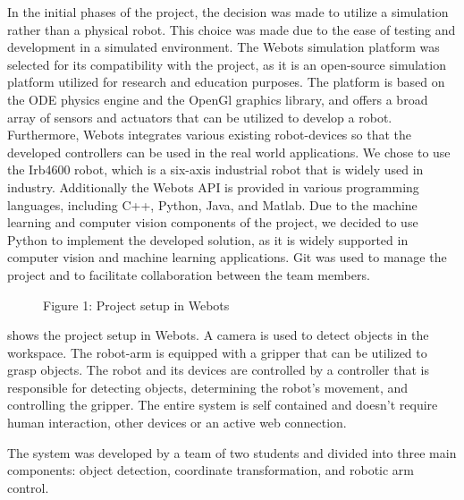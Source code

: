 In the initial phases of the project, the decision was made to utilize a simulation rather than a physical robot. This choice was made due to the ease of testing and development in a simulated environment. The Webots simulation platform was selected for its compatibility with the project, as it is an open-source simulation platform utilized for research and education purposes. The platform is based on the ODE physics engine and the OpenGl graphics library, and offers a broad array of sensors and actuators that can be utilized to develop a robot. Furthermore, Webots integrates various existing robot-devices so that the developed controllers can be used in the real world applications. We chose to use the Irb4600 robot, which is a six-axis industrial robot that is widely used in industry. Additionally the Webots API is provided in various programming languages, including C++, Python, Java, and Matlab. Due to the machine learning and computer vision components of the project, we decided to use Python to implement the developed solution, as it is widely supported in computer vision and machine learning applications. Git was used to manage the project and to facilitate collaboration between the team members.


\begin{figure}[!h]
    \centering
    \caption{Figure 1: Project setup in Webots }
    \label{fig:project_setup}
\end{figure}

 shows the project setup in Webots. A camera is used to detect objects in the workspace. The robot-arm is equipped with a gripper that can be utilized to grasp objects. The robot and its devices are controlled by a controller that is responsible for detecting objects, determining the robot's movement, and controlling the gripper. The entire system is self contained and doesn't require human interaction, other devices or an active web connection.

The system was developed by a team of two students and divided into three main components: object detection, coordinate transformation, and robotic arm control. 

